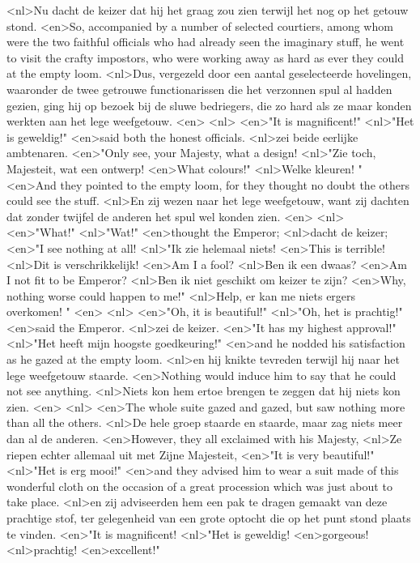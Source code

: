<nl>Nu dacht de keizer dat hij het graag zou zien terwijl het nog op het getouw stond.
<en>So, accompanied by a number of selected courtiers, among whom were the two faithful officials who had already seen the imaginary stuff, he went to visit the crafty impostors, who were working away as hard as ever they could at the empty loom.
<nl>Dus, vergezeld door een aantal geselecteerde hovelingen, waaronder de twee getrouwe functionarissen die het verzonnen spul al hadden gezien, ging hij op bezoek bij de sluwe bedriegers, die zo hard als ze maar konden werkten aan het lege weefgetouw.
<en>
<nl>
<en>"It is magnificent!"
<nl>"Het is geweldig!"
<en>said both the honest officials.
<nl>zei beide eerlijke ambtenaren.
<en>"Only see, your Majesty, what a design!
<nl>"Zie toch, Majesteit, wat een ontwerp!
<en>What colours!"
<nl>Welke kleuren! "
<en>And they pointed to the empty loom, for they thought no doubt the others could see the stuff.
<nl>En zij wezen naar het lege weefgetouw, want zij dachten  dat zonder twijfel de anderen het spul wel konden zien.
<en>
<nl>
<en>"What!"
<nl>"Wat!"
<en>thought the Emperor;
<nl>dacht de keizer;
<en>"I see nothing at all!
<nl>"Ik zie helemaal niets!
<en>This is terrible!
<nl>Dit is verschrikkelijk!
<en>Am I a fool?
<nl>Ben ik een dwaas?
<en>Am I not fit to be Emperor?
<nl>Ben ik niet geschikt om keizer te zijn?
<en>Why, nothing worse could happen to me!"
<nl>Help, er kan me niets ergers overkomen! "
<en>
<nl>
<en>"Oh, it is beautiful!"
<nl>"Oh, het is prachtig!"
<en>said the Emperor.
<nl>zei de keizer.
<en>"It has my highest approval!"
<nl>"Het heeft mijn hoogste goedkeuring!"
<en>and he nodded his satisfaction as he gazed at the empty loom.
<nl>en hij knikte tevreden terwijl hij naar het lege weefgetouw staarde.
<en>Nothing would induce him to say that he could not see anything.
<nl>Niets kon hem ertoe brengen te zeggen dat hij niets kon zien.
<en>
<nl>
<en>The whole suite gazed and gazed, but saw nothing more than all the others.
<nl>De hele groep staarde en staarde, maar zag niets meer dan al de anderen.
<en>However, they all exclaimed with his Majesty,
<nl>Ze riepen echter allemaal uit met Zijne Majesteit,
<en>"It is very beautiful!"
<nl>"Het is erg mooi!"
<en>and they advised him to wear a suit made of this wonderful cloth on the occasion of a great procession which was just about to take place.
<nl>en zij adviseerden hem een pak te dragen gemaakt  van deze prachtige stof, ter gelegenheid van een grote optocht die op het punt stond plaats te vinden.
<en>"It is magnificent!
<nl>"Het is geweldig!
<en>gorgeous!
<nl>prachtig!
<en>excellent!"
